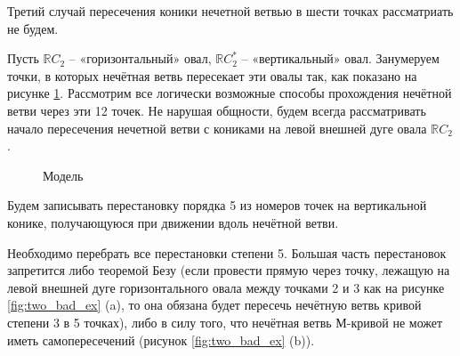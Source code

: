 \documentclass[14pt]{article}
\begin{document}
Третий случай пересечения коники нечетной ветвью в шести точках рассматриать не будем.

Пусть $\mathbb RC_2$ -- «горизонтальный» овал, $\mathbb RC_2^*$ -- «вертикальный» овал. Занумеруем точки, в которых нечётная ветвь пересекает эти овалы так, как показано на рисунке \ref{fig:model_1-5}. Рассмотрим все логически возможные способы прохождения нечётной ветви через эти 12 точек. Не нарушая общности, будем всегда рассматривать начало пересечения нечетной ветви с кониками на левой внешней дуге овала $\mathbb RC_2$. 

\begin{figure}[H]
\caption{Модель}
\label{fig:model_1-5}
\end{figure}

Будем записывать перестановку порядка 5 из номеров точек на вертикальной конике, получающуюся при движении вдоль нечётной ветви.  

Необходимо перебрать все перестановки степени 5. Большая часть перестановок запретится либо теоремой Безу (если провести прямую через точку, лежащую на левой внешней дуге горизонтального овала между точками 2 и 3 как на рисунке \ref{fig:two_bad_ex} (a), то она обязана будет пересечь нечётную ветвь кривой степени 3 в 5 точках), либо в силу того, что нечётная ветвь М-кривой не может иметь самопересечений (рисунок \ref{fig:two_bad_ex} (b)).
\end{document}
